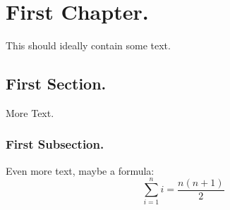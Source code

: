 \documentclass[12pt]{report}
\begin{document}
\clearpage



\tableofcontents


\listoffigures

\listoftables



\clearpage



\setcounter{page}{1}

%
%
\chapter{First Chapter.}
This should ideally contain some text.
\section{First Section.}
More Text.
\subsection[Alternative title for the Table of Contents]{First Subsection.}
Even more text, maybe a formula:
\begin{equation}
\sum_{i=1}^{n}i=\frac{n(n+1)}{2} %
\end{equation}
\end{document}
